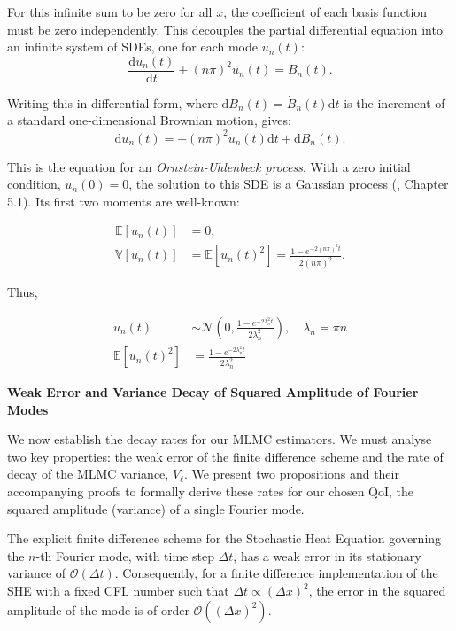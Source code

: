 For
this infinite sum to be zero for all $x$, the coefficient of each basis
function must be zero independently. This decouples the partial differential 
equation into an infinite system of SDEs, one for each mode 
$u_n(t)$: 
$$\frac{\mathrm{d}u_n(t)}{\mathrm{d}t} + (n\pi)^2 u_n(t) = \dot{B}_n(t).$$

Writing this in differential form, where $\mathrm{d}B_n(t) = 
\dot{B}_n(t)\mathrm{d}t$ is the 
increment of a standard one-dimensional Brownian motion, 
gives:
$$
\mathrm{d}u_n(t) = -(n\pi)^2 u_n(t)\mathrm{d}t + \mathrm{d}B_n(t).
$$ 

This is the equation for an \textit{Ornstein-Uhlenbeck process}.
With a zero initial condition, $u_n(0)=0$, the solution to 
this SDE is a Gaussian process (\cite{oksendal2013stochastic}, Chapter 5.1). 
Its first two moments are well-known:

\begin{align}\label{eq:moments_of_fourier_modes}
\mathbb{E}[u_n(t)] &= 0, \\
\mathbb{V}[u_n(t)] &= \mathbb{E}[u_n(t)^2] = 
 \frac{1 - e^{-2(n\pi)^2 t}}{2(n\pi)^2}. \label{eq:var_fourier_modes}
\end{align}

Thus,

\begin{align}
    u_n(t) &\sim \mathcal{N}(0, 
    \frac{1-e^{-2\lambda_n^2t}}{2\lambda_n^2}), 
    \quad \lambda_n = \pi n
    \nonumber
    \\
    \mathbb{E}\left[u_n(t)^2\right] &= \frac{1 - e^{-2\lambda_n^2t}}{2\lambda_n^2}
    \label{eq:squared_amplitude_analytic}
\end{align}
\newline

\textbf{Weak Error and Variance Decay of Squared Amplitude of Fourier Modes}

We now establish the decay
rates for our MLMC estimators. We must analyse two key properties:
the weak error of the finite difference scheme and the rate 
of decay of the MLMC variance, $V_\ell$. We present 
two propositions and their accompanying proofs to formally 
derive these rates for our chosen QoI, the squared amplitude (variance)
of a single Fourier mode. 

\begin{proposition}
    \label{prop:weak_error_for_fourier_mode}
    The explicit finite difference scheme for the Stochastic Heat Equation
    governing the $n$-th Fourier mode, with time step $\Delta t$, has a weak error 
    in its stationary variance of 
    $\mathcal{O}(\Delta t)$. Consequently, for a finite difference 
    implementation of the SHE with a fixed CFL number such that 
    $\Delta t \propto (\Delta x)^2$, the error in the squared amplitude of the mode 
    is of order $\mathcal{O}((\Delta x)^2)$. 
\end{proposition}

